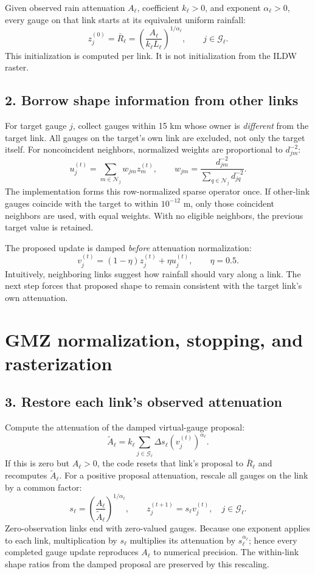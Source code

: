 \documentclass[11pt,a4paper]{article}
\begin{document}
Given observed rain attenuation $A_\ell$, coefficient $k_\ell>0$, and exponent $\alpha_\ell>0$, every gauge on that link starts at its equivalent uniform rainfall:
\[
 z_j^{(0)}=\bar R_\ell=\left(\frac{A_\ell}{k_\ell L_\ell}\right)^{1/\alpha_\ell},
 \qquad j\in\mathcal G_\ell.
\]
This initialization is computed per link. It is not initialization from the ILDW raster.

\subsection*{2. Borrow shape information from other links}
For target gauge $j$, collect gauges within 15 km whose owner is \emph{different} from the target link. All gauges on the target's own link are excluded, not only the target itself. For noncoincident neighbors, normalized weights are proportional to $d_{jm}^{-2}$:
\[
 u_j^{(t)}=\sum_{m\in\mathcal N_j}w_{jm}z_m^{(t)},\qquad
 w_{jm}=\frac{d_{jm}^{-2}}{\sum_{q\in\mathcal N_j}d_{jq}^{-2}}.
\]
The implementation forms this row-normalized sparse operator once. If other-link gauges coincide with the target to within $10^{-12}$ m, only those coincident neighbors are used, with equal weights. With no eligible neighbors, the previous target value is retained.

The proposed update is damped \emph{before} attenuation normalization:
\[
 v_j^{(t)}=(1-\eta)z_j^{(t)}+\eta u_j^{(t)},\qquad \eta=0.5.
\]
Intuitively, neighboring links suggest how rainfall should vary along a link. The next step forces that proposed shape to remain consistent with the target link's own attenuation.

\clearpage
\section{GMZ normalization, stopping, and rasterization}
\subsection*{3. Restore each link's observed attenuation}
Compute the attenuation of the damped virtual-gauge proposal:
\[
 \widetilde A_\ell= k_\ell\sum_{j\in\mathcal G_\ell}\Delta s_\ell
                  (v_j^{(t)})^{\alpha_\ell}.
\]
If this is zero but $A_\ell>0$, the code resets that link's proposal to $\bar R_\ell$ and recomputes $\widetilde A_\ell$. For a positive proposal attenuation, rescale all gauges on the link by a common factor:
\[
 s_\ell=\left(\frac{A_\ell}{\widetilde A_\ell}\right)^{1/\alpha_\ell},
 \qquad z_j^{(t+1)}=s_\ell v_j^{(t)},\quad j\in\mathcal G_\ell.
\]
Zero-observation links end with zero-valued gauges. Because one exponent applies to each link, multiplication by $s_\ell$ multiplies its attenuation by $s_\ell^{\alpha_\ell}$; hence every completed gauge update reproduces $A_\ell$ to numerical precision. The within-link shape ratios from the damped proposal are preserved by this rescaling.
\end{document}
